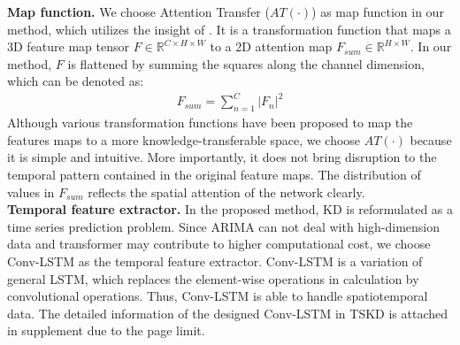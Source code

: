 \documentclass[letterpaper]{article} %
\begin{document}
\noindent\textbf{Map function.} We choose Attention Transfer ($AT(\cdot)$) as map function in our method, which utilizes the insight of \cite{zagoruyko2016paying}. It is a transformation function that maps a 3D feature map tensor $F \in \mathbb{R}^{C\times H\times W}$ to a 2D attention map $F_{sum} \in \mathbb{R}^{H\times W}$. In our method, $F$ is flattened by summing the squares along the channel dimension, which can be denoted as:
\begin{align}
    F_{sum} = \textstyle \sum _{n=1}^{C}|F_{n}|^{2}
\end{align}
Although various transformation functions have been proposed \cite{tian2019contrastive, heo2019comprehensive} to map the features maps to a more knowledge-transferable space, we choose $AT(\cdot)$ because it is simple and intuitive. More importantly, it does not bring disruption to the temporal pattern contained in the original feature maps. The distribution of values in $F_{sum}$ reflects the spatial attention of the network clearly.
\\
\noindent\textbf{Temporal feature extractor.} In the proposed method, KD is reformulated as a time series prediction problem. Since ARIMA \cite{box1970distribution} can not deal with high-dimension data and transformer \cite{vaswani2017attention} may contribute to higher computational cost, we choose Conv-LSTM \cite{shi2015convolutional} as the temporal feature extractor.
Conv-LSTM is a variation of general LSTM, which replaces the element-wise operations in calculation by convolutional operations. Thus, Conv-LSTM is able to handle spatiotemporal data. The detailed information of the designed Conv-LSTM in TSKD is attached in supplement due to the page limit.
\end{document}
